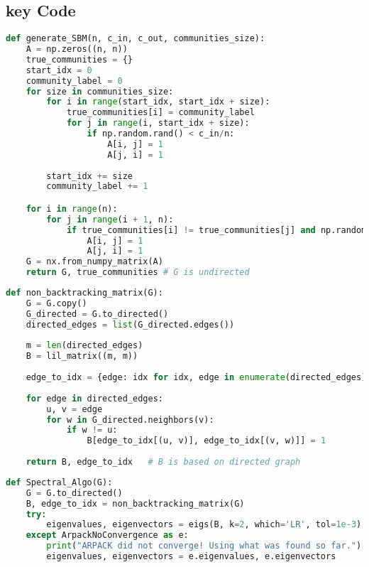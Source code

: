 \begin{appendices}
    
\chapter{key Code}
\begin{lstlisting}[language=Python, caption=Implementation of Stochastic Block Model for 2 communities case, label=code:SBM for k=2, numbers=none]
def generate_SBM(n, c_in, c_out, communities_size):
    A = np.zeros((n, n))
    true_communities = {}
    start_idx = 0
    community_label = 0
    for size in communities_size:
        for i in range(start_idx, start_idx + size):
            true_communities[i] = community_label
            for j in range(i, start_idx + size):
                if np.random.rand() < c_in/n:
                    A[i, j] = 1
                    A[j, i] = 1
        
        start_idx += size
        community_label += 1

    for i in range(n):
        for j in range(i + 1, n):
            if true_communities[i] != true_communities[j] and np.random.rand() < c_out/n:
                A[i, j] = 1
                A[j, i] = 1
    G = nx.from_numpy_matrix(A)
    return G, true_communities # G is undirected
\end{lstlisting}
\vspace{10mm}
\begin{lstlisting}[language=Python, caption=Implementation of Non-Backtracking Matrix, label=code:non-backtracking, numbers=none]
def non_backtracking_matrix(G):
    G = G.copy()
    G_directed = G.to_directed()
    directed_edges = list(G_directed.edges())
    
    m = len(directed_edges)
    B = lil_matrix((m, m))
    
    edge_to_idx = {edge: idx for idx, edge in enumerate(directed_edges)}
    
    for edge in directed_edges:
        u, v = edge
        for w in G_directed.neighbors(v):
            if w != u:
                B[edge_to_idx[(u, v)], edge_to_idx[(v, w)]] = 1
                
    return B, edge_to_idx   # B is based on directed graph
\end{lstlisting}
\vspace{10mm}
\begin{lstlisting}[language=Python, caption=Implementation of the Spectral Algorithm based on Non-Backtracking Matrix, label=code: spec_algo, numbers=none]
def Spectral_Algo(G):
    G = G.to_directed()
    B, edge_to_idx = non_backtracking_matrix(G)
    try:
        eigenvalues, eigenvectors = eigs(B, k=2, which='LR', tol=1e-3)
    except ArpackNoConvergence as e:
        print("ARPACK did not converge! Using what was found so far.")
        eigenvalues, eigenvectors = e.eigenvalues, e.eigenvectors
    

\end{lstlisting}
\end{appendices}
